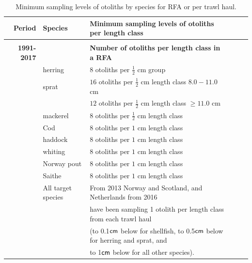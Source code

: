 \documentclass[a4paper 12pt]{article}
\numberwithin{equation}{section}
\newcommand{\cm}{\textnormal{\sffamily cm}\xspace}
\begin{document}
\begin{small}
\begin{table}[h!]
\centering
\caption{Minimum sampling levels of otoliths by species for RFA or per trawl haul.}
\label{tab:otolithsTable}
\begin{tabularx}{\linewidth}{r l l l l X}
\toprule 
Period &  Species  & Minimum sampling levels of otoliths per length class    \\[0.7ex]
\midrule \\[0.1ex]
{\bf 1991-2017} & & {\bf Number of otoliths per length class in a RFA}  \\[1.0ex]
     & herring  &  $8$  otoliths per $\frac{1}{2}$ cm group \\[0.5ex]
     & sprat    & $16$  otoliths per $\frac{1}{2}$ cm length class  $8.0 -11.0$ cm\\[0.5ex]
              & & $12$  otoliths per $\frac{1}{2}$ cm length class  $\geq 11.0$ cm\\[0.5ex]
& mackerel      & $8$  otoliths per $\frac{1}{2}$ cm length class \\[0.5ex]
& Cod       	  & $8$  otoliths per $1$ cm length class\\[0.5ex]
&haddock   	  & $8$  otoliths per $1$ cm length class \\[0.5ex]
&whiting    	  & $8$  otoliths per $1$ cm length class \\[0.5ex]
&Norway pout   & $8$  otoliths per $1$ cm length class\\[0.5ex]
&Saithe        & $8$  otoliths per $1$ cm length class \\[1ex] 
& All target species      &  From 2013 Norway and Scotland, and  Netherlands from 2016 \\[0.7ex] 
&& have been sampling 1 otolith per length class from each trawl haul \\[0.7ex] 
&& (to 0.1$\cm$ below for shellfish, to 0.5$\cm$ below for herring and sprat, and \\ [0.7ex] 
&& to 1$\cm$ below for all other species).\\[1.7ex] 


\end{tabularx}
\end{table}
\end{small}
\end{document}
